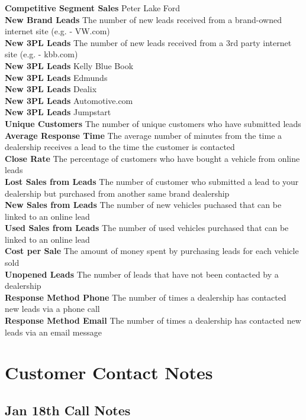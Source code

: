 \documentclass[11pt,a4paper,oneside]{article}
\begin{document}
\textbf{Competitive Segment Sales} Peter Lake Ford\\
\textbf{New Brand Leads} The number of new leads received from a brand-owned internet site (e.g. - VW.com)\\
\textbf{New 3PL Leads} The number of new leads received from a 3rd party internet site (e.g. - kbb.com)\\
\textbf{New 3PL Leads} Kelly Blue Book\\
\textbf{New 3PL Leads} Edmunds\\
\textbf{New 3PL Leads} Dealix\\
\textbf{New 3PL Leads} Automotive.com\\
\textbf{New 3PL Leads} Jumpstart\\
\textbf{Unique Customers} The number of unique customers who have submitted leads\\
\textbf{Average Response Time} The average number of minutes from the time a dealership receives a lead to the time the customer is contacted\\
\textbf{Close Rate} The percentage of customers who have bought a vehicle from online leads\\
\textbf{Lost Sales from Leads} The number of customer who submitted a lead to your dealership but purchased from another same brand dealership\\
\textbf{New Sales from Leads} The number of new vehicles puchased that can be linked to an online lead\\
\textbf{Used Sales from Leads} The number of used vehicles purchased that can be linked to an online lead\\
\textbf{Cost per Sale} The amount of money spent by purchasing leads for each vehicle sold\\
\textbf{Unopened Leads} The number of leads that have not been contacted by a dealership\\
\textbf{Response Method Phone} The number of times a dealership has contacted new leads via a phone call\\
\textbf{Response Method Email} The number of times a dealership has contacted new leads via an email message\\


\section{Customer Contact Notes}
\subsection{Jan 18th Call Notes}
\end{document}
